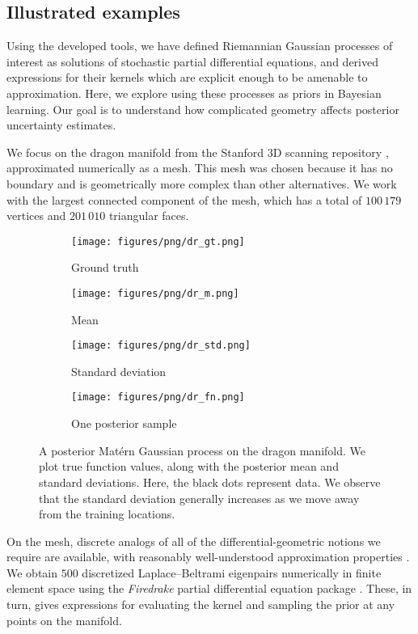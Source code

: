 \documentclass[11pt]{book}
\begin{document}
\subsection{Illustrated examples}

Using the developed tools, we have defined Riemannian Gaussian processes of interest as solutions of stochastic partial differential equations, and derived expressions for their kernels which are explicit enough to be amenable to approximation. 
Here, we explore using these processes as priors in Bayesian learning.
Our goal is to understand how complicated geometry affects posterior uncertainty estimates.

We focus on the dragon manifold from the Stanford 3D scanning repository \cite{curless96}, approximated numerically as a mesh.
This mesh was chosen because it has no boundary and is geometrically more complex than other alternatives.
We work with the largest connected component of the mesh, which has a total of $100\,179$ vertices and $201\,010$ triangular faces.

\begin{figure}
\begin{subfigure}{0.49\textwidth}
\texttt{[image: figures/png/dr\_gt.png]}
\caption{Ground truth}
\end{subfigure}
\begin{subfigure}{0.49\textwidth}
\texttt{[image: figures/png/dr\_m.png]}
\caption{Mean}
\end{subfigure}
\begin{subfigure}{0.49\textwidth}
\texttt{[image: figures/png/dr\_std.png]}
\caption{Standard deviation}
\end{subfigure}
\begin{subfigure}{0.49\textwidth}
\texttt{[image: figures/png/dr\_fn.png]}
\caption{One posterior sample}
\end{subfigure}
\caption[Posterior Gaussian process: dragon manifold]{A posterior Matérn Gaussian process on the dragon manifold. We plot true function values, along with the posterior mean and standard deviations. Here, the black dots represent data. We observe that the standard deviation generally increases as we move away from the training locations.}
\label{fig:dr-posterior}
\end{figure}

On the mesh, discrete analogs of all of the differential-geometric notions we require are available, with reasonably well-understood approximation properties \cite{crane17}.
We obtain $500$ discretized Laplace--Beltrami eigenpairs numerically in finite element space using the \emph{Firedrake} partial differential equation package \cite{rathgeber16}.
These, in turn, gives expressions for evaluating the kernel and sampling the prior at any points on the manifold.
\end{document}

